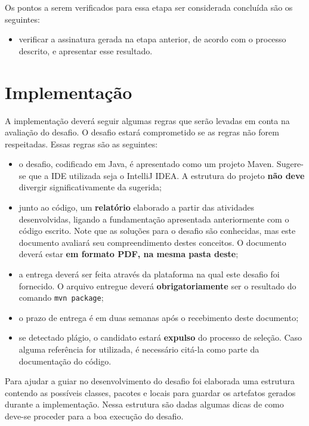 \documentclass{article}
\begin{document}
Os pontos a serem verificados para essa etapa ser considerada concluída são os
seguintes:

\begin{itemize}
  \item verificar a assinatura gerada na etapa anterior, de acordo com o
      processo descrito, e apresentar esse resultado.
\end{itemize}

\section{Implementação}\label{sec:impl}

A implementação deverá seguir algumas regras que serão levadas em conta na
avaliação do desafio. O desafio estará comprometido se as regras não forem
respeitadas. Essas regras são as seguintes:

\begin{itemize}
  \item o desafio, codificado em Java, é apresentado como um projeto Maven.
      Sugere-se que a IDE utilizada seja o IntelliJ IDEA\@. A estrutura do
        projeto \textbf{não deve} divergir significativamente da sugerida;
  \item junto ao código, um \textbf{relatório} elaborado a partir das
      atividades desenvolvidas, ligando a fundamentação apresentada
        anteriormente com o código escrito. Note que as soluções para o desafio
        são conhecidas, mas este documento avaliará seu compreendimento destes
        conceitos. O documento deverá estar \textbf{em formato PDF, na mesma
        pasta deste};
  \item a entrega deverá ser feita através da plataforma na qual este
      desafio foi fornecido. O arquivo entregue deverá
        \textbf{obrigatoriamente} ser o resultado do comando \texttt{mvn
        package};
  \item o prazo de entrega é em duas semanas após o recebimento deste
      documento;
  \item se detectado plágio, o candidato estará \textbf{expulso} do processo de
      seleção. Caso alguma referência for utilizada, é necessário citá-la como
        parte da documentação do código.
\end{itemize}

Para ajudar a guiar no desenvolvimento do desafio foi elaborada uma estrutura
contendo as possíveis classes, pacotes e locais para guardar os artefatos
gerados durante a implementação. Nessa estrutura são dadas algumas dicas de
como deve-se proceder para a boa execução do desafio.
\end{document}
